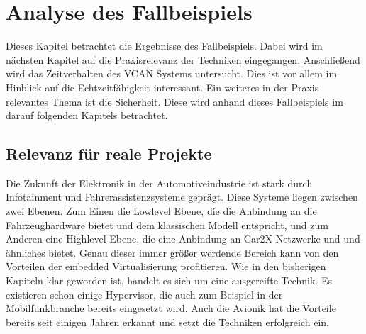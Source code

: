 \documentclass[
  a4paper,					    %
  twoside,
  DIV=calc,     				%
  bibliography=totoc,
  cleardoublepage=empty,
  ngerman,     					%
  final       					%
]{scrbook}
\begin{document}
\chapter{Analyse des Fallbeispiels}
\label{sec:Beispiel_Analyse}
Dieses Kapitel betrachtet die Ergebnisse des Fallbeispiels. Dabei wird im nächsten Kapitel auf die Praxisrelevanz der Techniken eingegangen. Anschließend wird das Zeitverhalten des VCAN Systems untersucht. Dies ist vor allem im Hinblick auf die Echtzeitfähigkeit interessant. Ein weiteres in der Praxis relevantes Thema ist die Sicherheit. Diese wird anhand dieses Fallbeispiels im darauf folgenden Kapitels betrachtet.



\section{Relevanz für reale Projekte}
\label{sec:Relevanz}
Die Zukunft der Elektronik in der Automotiveindustrie ist stark durch Infotainment und Fahrerassistenzsysteme geprägt. Diese Systeme liegen zwischen zwei Ebenen. Zum Einen die Lowlevel Ebene, die die Anbindung an die Fahrzeughardware bietet und dem klassischen Modell entspricht, und zum Anderen eine Highlevel Ebene, die eine Anbindung an Car2X Netzwerke und und ähnliches bietet. Genau dieser immer größer werdende Bereich kann von den Vorteilen der embedded Virtualisierung profitieren. Wie in den bisherigen Kapiteln klar geworden ist, handelt es sich um eine ausgereifte Technik. Es existieren schon einige Hypervisor, die auch zum Beispiel in der Mobilfunkbranche bereits eingesetzt wird. Auch die Avionik hat die Vorteile bereits seit einigen Jahren erkannt und setzt die Techniken erfolgreich ein.
\end{document}
